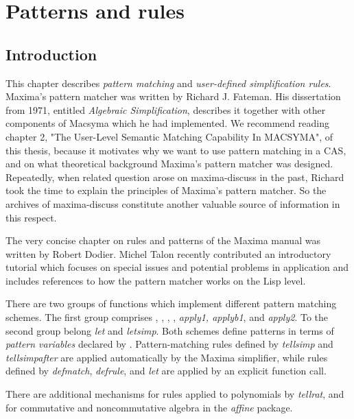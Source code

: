 \documentclass[../Maxima_Workbook.tex]{subfiles}
\begin{document}
	
\chapter{Patterns and rules}

\section{Introduction}

This chapter describes \emph{pattern matching} and \emph{user-defined simplification rules}. Maxima's pattern matcher was written by Richard J. Fateman. His dissertation from 1971, entitled \emph{Algebraic Simplification}, describes it together with other components of Macsyma which he had implemented. We recommend reading chapter 2, "The User-Level Semantic Matching Capability In MACSYMA", of this thesis, because it motivates why we want to use pattern matching in a CAS, and on what theoretical background Maxima's pattern matcher was designed. Repeatedly, when related question arose on maxima-discuss in the past, Richard took the time to explain the principles of Maxima's pattern matcher. So the archives of maxima-discuss constitute another valuable source of information in this respect.

\lz The very concise chapter on rules and patterns of the Maxima manual was written by Robert Dodier. Michel Talon recently contributed an introductory tutorial which focuses on special issues and potential problems in application and includes references to how the pattern matcher works on the Lisp level.

\lz There are two groups of functions which implement different pattern matching schemes. The first group comprises , , , , \emph{apply1, applyb1}, and \emph{apply2}. To the second group belong \emph{let} and \emph{letsimp}. Both schemes define patterns in terms of \emph{pattern variables} declared by . Pattern-matching rules defined by \emph{tellsimp} and \emph{tellsimpafter} are applied automatically by the Maxima simplifier, while rules defined by \emph{defmatch}, \emph{defrule}, and \emph{let} are applied by an explicit function call.

\lz There are additional mechanisms for rules applied to polynomials by \emph{tellrat}, and for commutative and noncommutative algebra in the \emph{affine} package.
\end{document}
